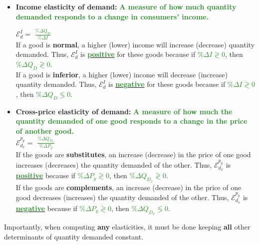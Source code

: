 \documentclass[11pt]{article}\usepackage[]{graphicx}\usepackage[]{color}
\theoremstyle{definition}
\newcommand{\ddp}[1]{{\textbf{\textcolor{ForestGreen}{#1}}}}
\newcommand{\dd}[1]{{\underline{\textbf{\textcolor{ForestGreen}{#1}}}}}
\newcommand{\defn}[1]{\textbf{#1}}
\begin{document}
	\begin{itemize}
		\item \defn{Income elasticity of demand:} \ddp{A measure of how much quantity demanded responds to a change in consumers' income.\\}
		
		$\mathcal{E}_d^I =$ \ddp{$\frac{\% \Delta Q_D}{\% \Delta I}$} 
		\\
		
		If a good is \defn{normal}, a higher (lower) income will increase (decrease) quantity demanded. Thus,  $\mathcal{E}_d^I$ is \dd{positive} for these goods because if \dd{$\%\Delta I\gtrless  0$}, then \dd{$\%\Delta Q_D\gtrless  0$}. 
		\\
		
		If a good is \defn{inferior},  a higher (lower) income will decrease (increase) quantity demanded. Thus, $\mathcal{E}_d^I$ is \dd{negative} for these goods because if \dd{$\%\Delta I\gtrless  0$}, then \dd{$\%\Delta Q_D\lessgtr  0$}. 
		
		\item \defn{Cross-price elasticity of demand:} \ddp{A measure of how much the quantity demanded of one good responds to a change in the price of another good.}
		\\
	
		 $\mathcal{E}_{d_x}^{p_y} =$ \ddp{$\frac{\% \Delta Q_{D_x}}{\% \Delta P_y}$} 
		\\
		
		If the goods are \defn{substitutes}, an increase (decrease) in the price of one good increases (decreases) the quantity demanded of the other. Thus, $\mathcal{E}_{d_x}^{p_y}$ is \dd{positive} because if \dd{$\%\Delta P_y \gtrless  0$}, then \dd{$\%\Delta Q_{D_x}\gtrless 0$}. 
		\\
		
		If the goods are \defn{complements}, an increase (decrease) in the price of one good decreases (increases) the quantity demanded of the other. Thus, $\mathcal{E}_{d_x}^{p_y}$ is \dd{negative} because if  \dd{$\%\Delta P_y\gtrless  0$}, then \dd{$\%\Delta Q_{D_x} \lessgtr  0$}. 
		
	\end{itemize}

	
	Importantly, when computing \textbf{any} elasticities, it must be done keeping \textbf{all} other determinants of quantity demanded constant.
\\
	
\end{document}
